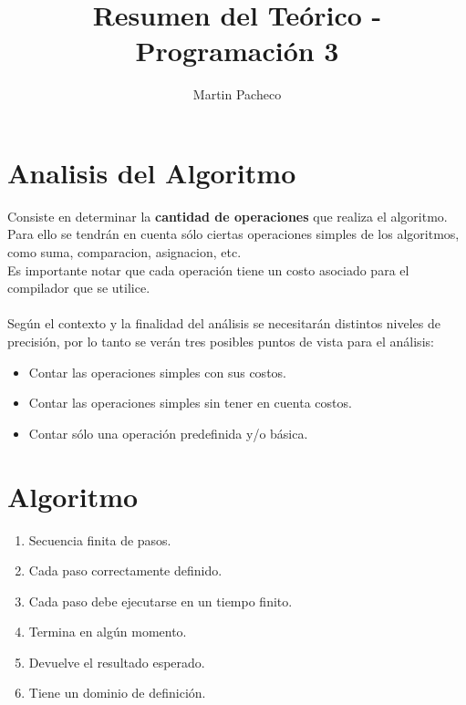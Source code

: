 \documentclass[a4paper,10pt]{article}
\title{Resumen del Teórico - Programación 3}
\author{Martin Pacheco}
\date{}
\begin{document}
\maketitle
\section{Analisis del Algoritmo}
Consiste en determinar la \textbf{cantidad de operaciones} que realiza el algoritmo.\\ Para ello se tendrán en
cuenta sólo ciertas operaciones simples de los algoritmos, como suma, comparacion, asignacion, etc. \\
Es importante notar que cada operación tiene un costo asociado para el compilador que se utilice. \\\\
Según el contexto y la finalidad del análisis se necesitarán distintos niveles de precisión, por lo
tanto se verán tres posibles puntos de vista para el análisis:
\begin{itemize}
  \item Contar las operaciones simples con sus costos.
  \item Contar las operaciones simples sin tener en cuenta costos.
  \item Contar sólo una operación predefinida y/o básica.
\end{itemize}
\section{Algoritmo}
\begin{enumerate}
  \item Secuencia finita de pasos.
  \item Cada paso correctamente definido.
  \item Cada paso debe ejecutarse en un tiempo finito.
  \item Termina en algún momento.
  \item Devuelve el resultado esperado.
  \item Tiene un dominio de definición.
\end{enumerate}
\end{document}
